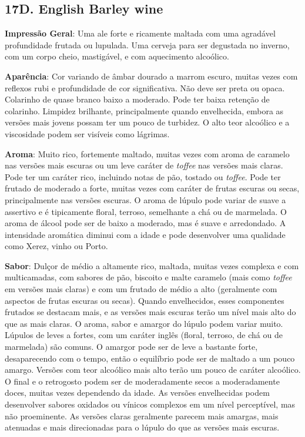 \subsection*{17D. English Barley wine}

\textbf{Impressão Geral}: Uma ale forte e ricamente maltada com uma agradável profundidade frutada ou lupulada. Uma cerveja para ser degustada no inverno, com um corpo cheio, mastigável, e com aquecimento alcoólico.

\textbf{Aparência}: Cor variando de âmbar dourado a marrom escuro, muitas vezes com reflexos rubi e profundidade de cor significativa. Não deve ser preta ou opaca. Colarinho de quase branco baixo a moderado. Pode ter baixa retenção de colarinho. Limpidez brilhante, principalmente quando envelhecida, embora as versões mais jovens possam ter um pouco de turbidez. O alto teor alcoólico e a viscosidade podem ser visíveis como lágrimas.

\textbf{Aroma}: Muito rico, fortemente maltado, muitas vezes com aroma de caramelo nas versões mais escuras ou um leve caráter de \textit{toffee} nas versões mais claras. Pode ter um caráter rico, incluindo notas de pão, tostado ou \textit{toffee}. Pode ter frutado de moderado a forte, muitas vezes com caráter de frutas escuras ou secas, principalmente nas versões escuras. O aroma de lúpulo pode variar de suave a assertivo e é tipicamente floral, terroso, semelhante a chá ou de marmelada. O aroma de álcool pode ser de baixo a moderado, mas é suave e arredondado. A intensidade aromática diminui com a idade e pode desenvolver uma qualidade como Xerez, vinho ou Porto.

\textbf{Sabor}: Dulçor de médio a altamente rico, maltada, muitas vezes complexa e com multicamadas, com sabores de pão, biscoito e malte caramelo (mais como \textit{toffee} em versões mais claras) e com um frutado de médio a alto (geralmente com aspectos de frutas escuras ou secas). Quando envelhecidos, esses componentes frutados se destacam mais, e as versões mais escuras terão um nível mais alto do que as mais claras. O aroma, sabor e amargor do lúpulo podem variar muito. Lúpulos de leves a fortes, com um caráter inglês (floral, terroso, de chá ou de marmelada) são comuns. O amargor pode ser de leve a bastante forte, desaparecendo com o tempo, então o equilíbrio pode ser de maltado a um pouco amargo. Versões com teor alcoólico mais alto terão um pouco de caráter alcoólico. O final e o retrogosto podem ser de moderadamente secos a moderadamente doces, muitas vezes dependendo da idade. As versões envelhecidas podem desenvolver sabores oxidados ou vínicos complexos em um nível perceptível, mas não proeminente. As versões claras geralmente parecem mais amargas, mais atenuadas e mais direcionadas para o lúpulo do que as versões mais escuras.

